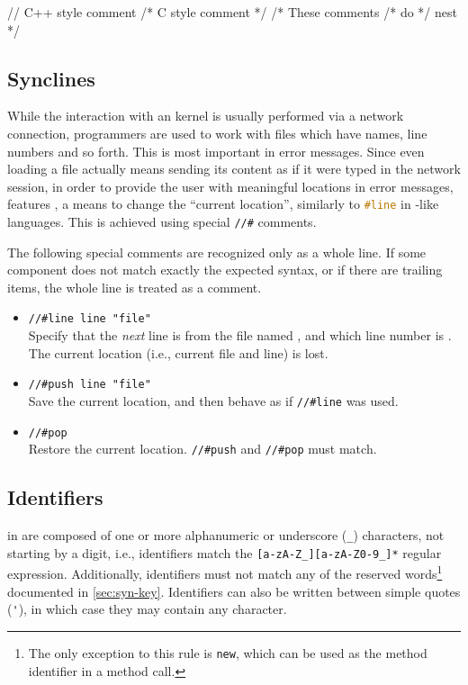 \begin{urbiscript}[firstnumber=last]
// C++ style comment
/* C style comment */
/* These comments /* do */ nest */
\end{urbiscript}

\subsection{Synclines}
\label{sec:specs:synclines}

While the interaction with an \us kernel is usually performed via a
network connection, programmers are used to work with files which have
names, line numbers and so forth.  This is most important in error
messages.  Since even loading a file actually means sending its
content as if it were typed in the network session, in order to
provide the user with meaningful locations in error messages, \us
features , a means to change the ``current
location'', similarly to \lstinline[language=C]|#line| in \C-like
languages.  This is achieved using special \lstinline|//#| comments.

The following special comments are recognized only as a whole line.
If some component does not match exactly the expected syntax, or if
there are trailing items, the whole line is treated as a comment.
\begin{itemize}
\item \lstinline|//#line line "file"|\\
  Specify that the \emph{next} line is from the file named ,
  and which line number is .  The current location (i.e.,
  current file and line) is lost.

\item \lstinline|//#push line "file"|\\
  Save the current location, and then behave as if \lstinline|//#line|
  was used.

\item \lstinline|//#pop|\\
  Restore the current location.  \lstinline|//#push| and
  \lstinline|//#pop| must match.
\end{itemize}


\subsection{Identifiers}
\label{sec:us-syn-id}

 in \us are composed of one or more alphanumeric or
underscore (\lstinline|_|) characters, not starting by a digit, i.e.,
identifiers match the \lstinline|[a-zA-Z_][a-zA-Z0-9_]*| regular
expression.  Additionally, identifiers must not match any of the \us
reserved words\footnote{
  The only exception to this rule is \lstinline|new|, which can be
  used as the method identifier in a method call.
} documented in \autoref{sec:syn-key}. Identifiers can also be written
between simple quotes (\lstinline|'|), in which case they may contain
any character.

